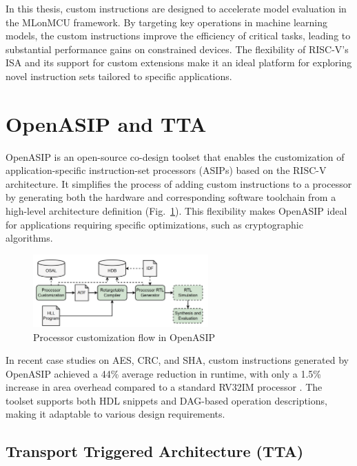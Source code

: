In this thesis, custom instructions are designed to accelerate model evaluation in the MLonMCU framework. By targeting key operations in machine learning models, the custom instructions improve the efficiency of critical tasks, leading to substantial performance gains on constrained devices. The flexibility of RISC-V's ISA and its support for custom extensions make it an ideal platform for exploring novel instruction sets tailored to specific applications.

\section{OpenASIP and TTA}

OpenASIP is an open-source co-design toolset that enables the customization of application-specific instruction-set processors (ASIPs) based on the RISC-V architecture. It simplifies the process of adding custom instructions to a processor by generating both the hardware and corresponding software toolchain from a high-level architecture definition (Fig.~\ref{fig:openasip}). This flexibility makes OpenASIP ideal for applications requiring specific optimizations, such as cryptographic algorithms.

\begin{figure}[h]
    \centering
    \includegraphics[width=0.6\textwidth]{figures/openasip.png}
    \caption{Processor customization flow in OpenASIP \cite{OpenASIP}}
    \label{fig:openasip}
\end{figure}

In recent case studies on AES, CRC, and SHA, custom instructions generated by OpenASIP achieved a 44\% average reduction in runtime, with only a 1.5\% increase in area overhead compared to a standard RV32IM processor \cite{OpenASIP}. The toolset supports both HDL snippets and DAG-based operation descriptions, making it adaptable to various design requirements.

\subsection{Transport Triggered Architecture (TTA)}

